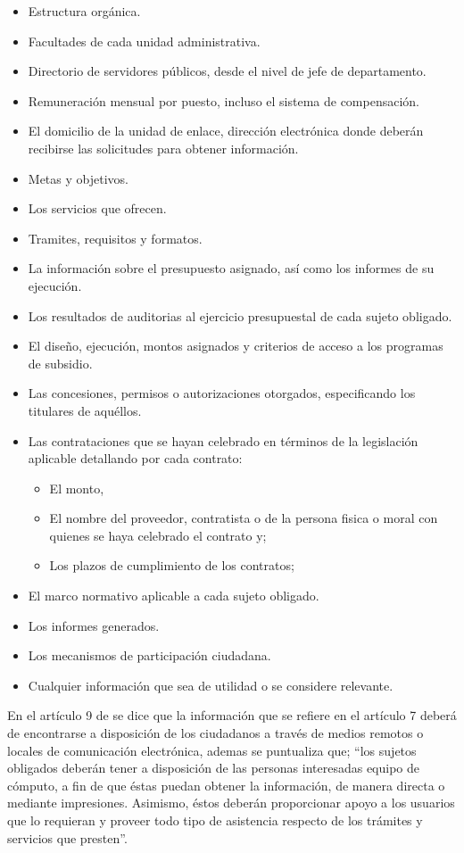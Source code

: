 \documentclass[runningheads,a4paper]{llncs}
\begin{document}
\begin{itemize}
	\item Estructura orgánica.
	\item Facultades de cada unidad administrativa.
	\item Directorio de servidores públicos, desde el nivel de jefe de departamento.
	\item Remuneración mensual por puesto, incluso el sistema de compensación.
	\item El domicilio de la unidad de enlace, dirección electrónica donde deberán recibirse las solicitudes para obtener información.
	\item Metas y objetivos.
	\item Los servicios que ofrecen.
	\item Tramites, requisitos y formatos.
	\item La información sobre el presupuesto asignado, así como los informes de su ejecución. 
	\item Los resultados de auditorias al ejercicio presupuestal de cada sujeto obligado.
	\item El diseño, ejecución, montos asignados y criterios de acceso a los programas de subsidio.
	\item Las concesiones, permisos o autorizaciones otorgados, especificando los titulares de aquéllos.
	\item Las contrataciones que se hayan celebrado en términos de la legislación aplicable detallando por
cada contrato:
		\begin{itemize}
			\item El monto,
			\item El nombre del proveedor, contratista o de la persona fisica o moral con quienes se haya celebrado el contrato y;
			\item Los plazos de cumplimiento de los contratos;
		\end{itemize}
	\item El marco normativo aplicable a cada sujeto obligado.
	\item Los informes generados.
	\item Los mecanismos de participación ciudadana.
	\item Cualquier información que sea de utilidad o se considere relevante.
\end{itemize}

En el artículo 9 de \cite{LTAIP_1} se dice que la información que se refiere en el artículo 7 deberá de encontrarse a disposición de los ciudadanos a través de medios remotos o locales de comunicación electrónica, ademas se puntualiza que; ``los sujetos obligados deberán tener a disposición de las personas interesadas equipo de cómputo, a fin de que éstas puedan obtener la información, de manera directa o mediante impresiones. Asimismo, éstos deberán proporcionar apoyo a los usuarios que lo requieran y proveer todo tipo de asistencia respecto de los trámites y servicios que presten''.\\
\end{document}
